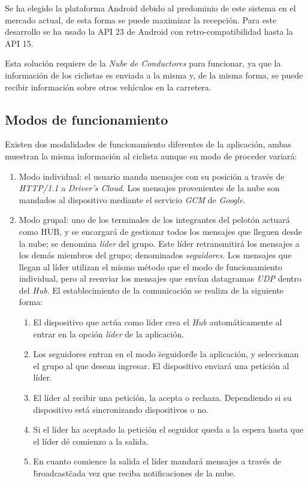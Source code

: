 Se ha elegido la plataforma Android debido al predominio de este sistema en el mercado actual, de esta forma se puede maximizar la recepción. Para este desarrollo se ha usado la API 23 de Android con retro-compatibilidad hasta la API 15.

Esta solución requiere de la \emph{Nube de Conductores} para funcionar, ya que la información de los ciclistas es enviada a la misma y, de la misma forma, se puede recibir información sobre otros vehículos en la carretera.

\subsection{Modos de funcionamiento}\label{ssection:commHUB}
Existen dos modalidades de funcionamiento diferentes de la aplicación, ambas muestran la misma información al ciclista aunque su modo de proceder variará:
		
\begin{enumerate}
	\item Modo individual: el usuario manda mensajes con su posición a través de \emph{HTTP/1.1} a \emph{Driver's Cloud}. Los mensajes provenientes de la nube son mandados al dispositivo mediante el servicio \emph{GCM} de \emph{Google}.	
	\item Modo grupal: uno de los terminales de los integrantes del pelotón actuará como HUB, y se encargará de gestionar todos los mensajes que lleguen desde la nube; se denomina \emph{líder} del grupo. Este líder retransmitirá los mensajes a los demás miembros del grupo; denominados \emph{seguidores}. Los mensajes que llegan al líder utilizan el mismo método que el modo de funcionamiento individual, pero al reenviar los mensajes que envían datagramas \emph{UDP} dentro del \emph{Hub}. El establecimiento de la comunicación se realiza de la siguiente forma:
	\begin{enumerate}
		\item El dispositivo que actúa como líder crea el \emph{Hub} automáticamente al entrar en la opción \emph{líder} de la aplicación.
		\item Los seguidores entran en el modo \"seguidor\" de la aplicación, y seleccionan el grupo al que desean ingresar. El dispositivo enviará una petición al líder.
		\item El líder al recibir una petición, la acepta o rechaza. Dependiendo si su dispositivo está sincronizando dispositivos o no.
		\item Si el líder ha aceptado la petición el seguidor queda a la espera hasta que el líder dé comienzo a la salida.
		\item En cuanto comience la salida el líder mandará mensajes a través de \"broadcast\" cada vez que reciba notificaciones de la nube.
	\end{enumerate}
\end{enumerate}


